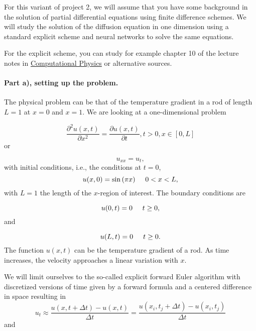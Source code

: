 \documentclass[%
oneside,                 %
final,                   %
10pt]{article}
\begin{document}
For this variant of project 2, we will assume that you have some
background in the solution of partial differential equations using
finite difference schemes. We will study the solution of the diffusion
equation in one dimension using a standard explicit scheme and neural
networks to solve the same equations.

For the explicit scheme, you can study for example chapter 10 of the lecture notes in \href{{https://github.com/CompPhysics/ComputationalPhysics/blob/master/doc/Lectures/lectures2015.pdf}}{Computational Physics} or alternative sources. 

\paragraph{Part a), setting up the problem.}
The physical problem can be that of the temperature gradient in a rod of length $L=1$ at $x=0$ and $x=1$.
We are looking at a one-dimensional
problem

\begin{equation*}
 \frac{\partial^2 u(x,t)}{\partial x^2} =\frac{\partial u(x,t)}{\partial t}, t> 0, x\in [0,L]
\end{equation*}
or

\begin{equation*}
u_{xx} = u_t,
\end{equation*}
with initial conditions, i.e., the conditions at $t=0$,
\begin{equation*}
u(x,0)= \sin{(\pi x)} \hspace{0.5cm} 0 < x < L,
\end{equation*}
with $L=1$ the length of the $x$-region of interest. The 
boundary conditions are

\begin{equation*}
u(0,t)= 0 \hspace{0.5cm} t \ge 0,
\end{equation*}
and

\begin{equation*}
u(L,t)= 0 \hspace{0.5cm} t \ge 0.
\end{equation*}
The function $u(x,t)$  can be the temperature gradient of a  rod.
As time increases, the velocity approaches a linear variation with $x$. 

We will limit ourselves to the so-called explicit forward Euler algorithm with discretized versions of time given by a forward formula and a centered difference in space resulting in   
\begin{equation*} 
u_t\approx \frac{u(x,t+\Delta t)-u(x,t)}{\Delta t}=\frac{u(x_i,t_j+\Delta t)-u(x_i,t_j)}{\Delta t}
\end{equation*}
and
\end{document}
